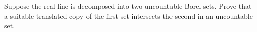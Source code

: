 Suppose the real line is decomposed into two uncountable Borel sets. Prove that a suitable translated copy of the first set intersects the second in an uncountable set.